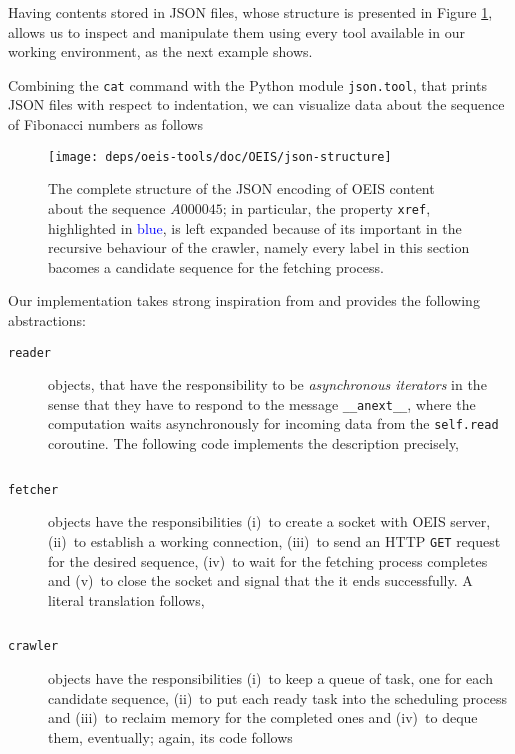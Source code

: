Having contents stored in JSON files, whose structure is presented in Figure
\ref{fig:json-structure}, allows us to inspect and manipulate them using every
tool available in our working environment, as the next example shows.

\begin{example}
Combining the \verb|cat| command with the Python module \verb|json.tool|, that
prints JSON files with respect to indentation, we can visualize data about the
sequence of Fibonacci numbers as follows
\end{example}

\begin{figure}
\texttt{[image: deps/oeis-tools/doc/OEIS/json-structure]}
\caption{The complete structure of the JSON encoding of OEIS content about the
sequence $A000045$; in particular, the property \texttt{xref}, highlighted in
\textcolor{blue}{blue}, is left expanded because of its important in the
recursive behaviour of the crawler, namely every label in this section bacomes
a candidate sequence for the fetching process.}
\label{fig:json-structure}
\end{figure}

Our implementation takes strong inspiration from
\citep{VANROSSUM:DAVIS:async:await} and provides the following abstractions:

\begin{description}

\item[\texttt{reader}] objects, that have the responsibility to be
\textit{asynchronous iterators} in the sense that they have to respond to the
message \verb|__anext__|, where the computation waits asynchronously for
incoming data from the \verb|self.read| coroutine. The following code
implements the description precisely,
\inputminted[stripnl=false,firstline=28,lastline=39,baselinestretch=0.8]
{python}{deps/oeis-tools/src/crawling.py} 

\item[\texttt{fetcher}] objects have the responsibilities (i)~to create a socket with
OEIS server, (ii)~to establish a working connection, (iii)~to send an HTTP \verb|GET|
request for the desired sequence, (iv)~to wait for the fetching process completes
and (v)~to close the socket and signal that the it ends successfully.
A literal translation follows,
\inputminted[stripnl=false,firstline=41,lastline=86,baselinestretch=0.8]
    {python}{deps/oeis-tools/src/crawling.py}

\item[\texttt{crawler}] objects have the responsibilities (i)~to keep a queue of task,
one for each candidate sequence, (ii)~to put each ready task into the
scheduling process and (iii)~to reclaim memory for the completed ones and
(iv)~to deque them, eventually; again, its code follows
\inputminted[stripnl=false,firstline=89,lastline=117,baselinestretch=0.8]
    {python}{deps/oeis-tools/src/crawling.py}

\end{description}

